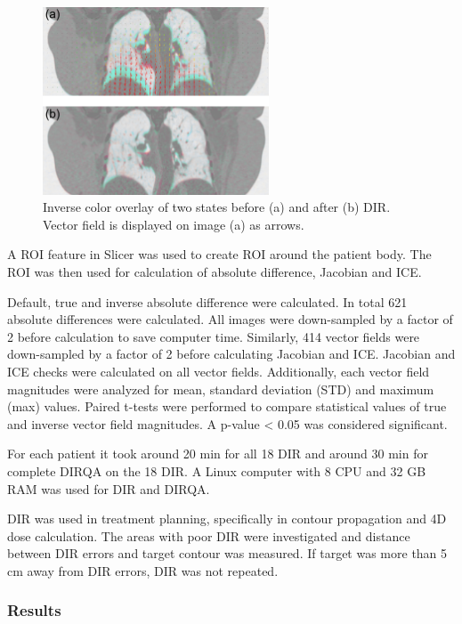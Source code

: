 \documentclass[type=dr, dr=rernat, accentcolor=tud7b,colorbacktitle, bigchapter, openright, twoside, 12pt ]{tudthesis}
\begin{document}
\begin{figure}[H]
	\begin{center}		
		\includegraphics[width=0.6\textwidth]{./Images/exampleReg.png}
		\caption{Inverse color overlay of two states before (a) and after (b) DIR. Vector field is displayed on image (a) as arrows.}
		\label{exampleReg_lung}
	\end{center}
\end{figure}

A ROI feature in Slicer was used to create ROI around the patient body. The ROI was then used for calculation of absolute difference, Jacobian and ICE.

Default, true and inverse absolute difference were calculated. In total 621 absolute differences were calculated. All images were down-sampled by a factor of 2
before calculation to save computer time. Similarly, 414 vector fields were down-sampled by a factor of 2 before calculating Jacobian and ICE. Jacobian and ICE checks were calculated on all vector fields.
Additionally, each vector field magnitudes were analyzed for mean, standard deviation (STD) and maximum (max) values. Paired t-tests were performed to compare statistical values of true and inverse vector field magnitudes.
A p-value < 0.05 was considered significant. 


For each patient it took around 20 min for all 18 DIR and around 30 min for complete DIRQA on the 18 DIR. A Linux computer with 8 CPU and 32 GB RAM was used for DIR and DIRQA.

DIR was used in treatment planning, specifically in contour propagation and 4D dose calculation. The areas with poor DIR were investigated and distance between DIR errors 
and target contour was measured. If target was more than 5 cm away from DIR errors, DIR was not repeated.


\subsubsection{Results}
\end{document}

